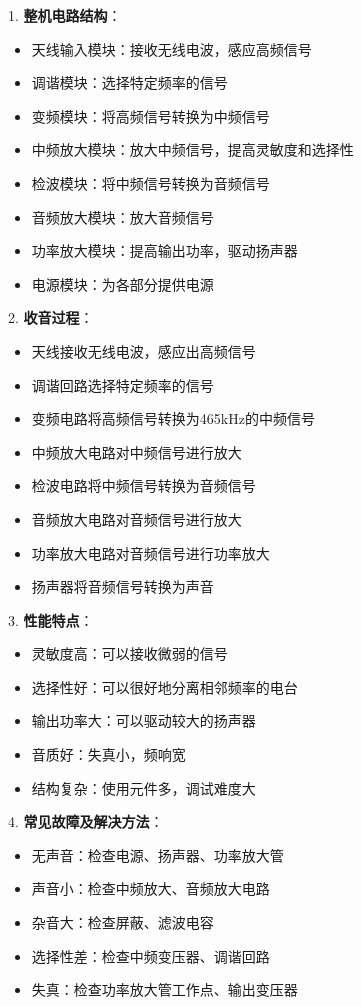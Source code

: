 \documentclass[12pt,UTF8]{ctexbook}
\begin{document}
1. \textbf{整机电路结构}：
   \begin{itemize}[leftmargin=3.5em]
   \item 天线输入模块：接收无线电波，感应高频信号
   \item 调谐模块：选择特定频率的信号
   \item 变频模块：将高频信号转换为中频信号
   \item 中频放大模块：放大中频信号，提高灵敏度和选择性
   \item 检波模块：将中频信号转换为音频信号
   \item 音频放大模块：放大音频信号
   \item 功率放大模块：提高输出功率，驱动扬声器
   \item 电源模块：为各部分提供电源
   \end{itemize}

2. \textbf{收音过程}：
   \begin{itemize}[leftmargin=3.5em]
   \item 天线接收无线电波，感应出高频信号
   \item 调谐回路选择特定频率的信号
   \item 变频电路将高频信号转换为465kHz的中频信号
   \item 中频放大电路对中频信号进行放大
   \item 检波电路将中频信号转换为音频信号
   \item 音频放大电路对音频信号进行放大
   \item 功率放大电路对音频信号进行功率放大
   \item 扬声器将音频信号转换为声音
   \end{itemize}

3. \textbf{性能特点}：
   \begin{itemize}[leftmargin=3.5em]
   \item 灵敏度高：可以接收微弱的信号
   \item 选择性好：可以很好地分离相邻频率的电台
   \item 输出功率大：可以驱动较大的扬声器
   \item 音质好：失真小，频响宽
   \item 结构复杂：使用元件多，调试难度大
   \end{itemize}

4. \textbf{常见故障及解决方法}：
   \begin{itemize}[leftmargin=3.5em]
   \item 无声音：检查电源、扬声器、功率放大管
   \item 声音小：检查中频放大、音频放大电路
   \item 杂音大：检查屏蔽、滤波电容
   \item 选择性差：检查中频变压器、调谐回路
   \item 失真：检查功率放大管工作点、输出变压器
   \end{itemize}
\end{document}
